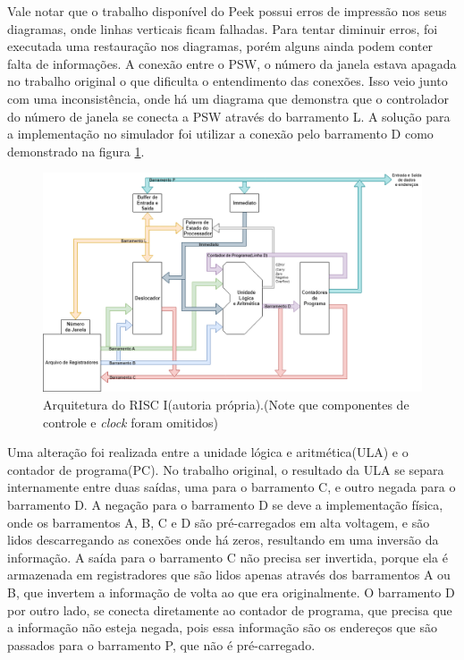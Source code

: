 \documentclass[
	article,			%
	11pt,				%
	oneside,			%
	a4paper,			%
	english,			%
	brazil,				%
	sumario=tradicional
	]{abntex2}
\begin{document}
Vale notar que o trabalho disponível do Peek possui erros de impressão nos seus diagramas, onde linhas verticais ficam falhadas. Para tentar diminuir erros, foi executada uma restauração nos diagramas, porém alguns ainda podem conter falta de informações. A conexão entre o PSW, o número da janela estava apagada no trabalho original o que dificulta o entendimento das conexões. Isso veio junto com uma inconsistência, onde há um diagrama que demonstra que o controlador do número de janela se conecta a PSW através do barramento L. A solução para a implementação no simulador foi utilizar a conexão pelo barramento D como demonstrado na figura \ref{fig:riscDatapath}.

\begin{figure}[H]
    \centering
    \includegraphics[width=0.75\linewidth]{ArquiteturaRISCI.png}
    \caption{Arquitetura do RISC I(autoria própria).(Note que componentes de controle e \textit{clock} foram omitidos)}
    \label{fig:riscDatapath}
\end{figure}

Uma alteração foi realizada entre a unidade lógica e aritmética(ULA) e o contador de programa(PC). No trabalho original, o resultado da ULA se separa internamente entre duas saídas, uma para o barramento C, e outro negada para o barramento D. A negação para o barramento D se deve a implementação física, onde os barramentos A, B, C e D são pré-carregados em alta voltagem, e são lidos descarregando as conexões onde há zeros, resultando em uma inversão da informação. A saída para o barramento C não precisa ser invertida, porque ela é armazenada em registradores que são lidos apenas através dos barramentos A ou B, que invertem a informação de volta ao que era originalmente. O barramento D por outro lado, se conecta diretamente ao contador de programa, que precisa que a informação não esteja negada, pois essa informação são os endereços que são passados para o barramento P, que não é pré-carregado.
\end{document}
